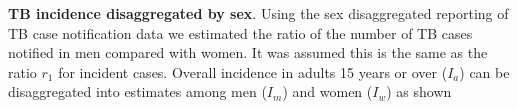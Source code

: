 \textbf{TB incidence disaggregated by sex}. Using the sex disaggregated reporting of TB case notification data we estimated the ratio of the number of TB cases notified in men compared with women. It was assumed this is the same as the ratio $r_1$ for incident cases\cite{Dodd_2014}. Overall incidence in adults 15 years or over ($I_a$) can be disaggregated into estimates among men ($I_m$) and women ($I_w$) as shown



